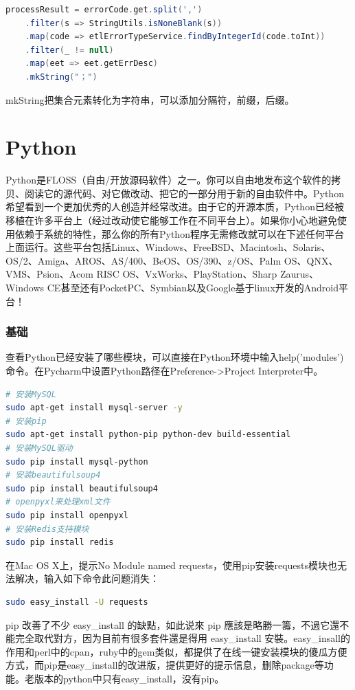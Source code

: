 \documentclass[letter]{book}
\begin{document}
\begin{lstlisting}[language=Scala]
processResult = errorCode.get.split(',')
	.filter(s => StringUtils.isNoneBlank(s))
	.map(code => etlErrorTypeService.findByIntegerId(code.toInt))
	.filter(_ != null)
	.map(eet => eet.getErrDesc)
	.mkString("；")
\end{lstlisting}

mkString把集合元素转化为字符串，可以添加分隔符，前缀，后缀。

\chapter{Python}

Python是FLOSS（自由/开放源码软件）之一。你可以自由地发布这个软件的拷贝、阅读它的源代码、对它做改动、把它的一部分用于新的自由软件中。Python希望看到一个更加优秀的人创造并经常改进。由于它的开源本质，Python已经被移植在许多平台上（经过改动使它能够工作在不同平台上）。如果你小心地避免使用依赖于系统的特性，那么你的所有Python程序无需修改就可以在下述任何平台上面运行。这些平台包括Linux、Windows、FreeBSD、Macintosh、Solaris、OS/2、Amiga、AROS、AS/400、BeOS、OS/390、z/OS、Palm OS、QNX、VMS、Psion、Acom RISC OS、VxWorks、PlayStation、Sharp Zaurus、Windows CE甚至还有PocketPC、Symbian以及Google基于linux开发的Android平台！

\subsection{基础}

查看Python已经安装了哪些模块，可以直接在Python环境中输入help('modules')命令。在Pycharm中设置Python路径在Preference->Project Interpreter中。

\begin{lstlisting}[language=Bash]
# 安装MySQL
sudo apt-get install mysql-server -y
# 安装pip
sudo apt-get install python-pip python-dev build-essential
# 安装MySQL驱动
sudo pip install mysql-python
# 安装beautifulsoup4
sudo pip install beautifulsoup4
# openpyxl来处理xml文件
sudo pip install openpyxl
# 安装Redis支持模块
sudo pip install redis
\end{lstlisting}

在Mac OS X上，提示No Module named requests，使用pip安装requests模块也无法解决，输入如下命令此问题消失：

\begin{lstlisting}[language=Bash]
sudo easy_install -U requests
\end{lstlisting}

pip 改善了不少 easy\_install 的缺點，如此说來 pip 應該是略勝一籌，不過它還不能完全取代對方，因为目前有很多套件還是得用 easy\_install 安裝。easy\_insall的作用和perl中的cpan，ruby中的gem类似，都提供了在线一键安装模块的傻瓜方便方式，而pip是easy\_install的改进版，提供更好的提示信息，删除package等功能。老版本的python中只有easy\_install，没有pip。
\end{document}
